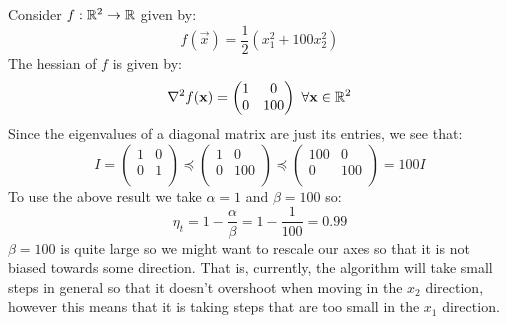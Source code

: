 \documentclass[../main.tex]{subfiles}
\begin{document}
\begin{example}
  Consider $f: \mathbb{R}^{2} \to \mathbb{R}$ given by:
  \[
    f(\vec{x}) = \frac{1}{2}(x^2_1 + 100x^2_2)
  \]
  The hessian of $f$ is given by:
  \[
    \nabla^2 f(\mathbf{\bm{x}}) = \begin{pmatrix}
    1 & 0 \\
    0 & 100 \\
    \end{pmatrix}\ \forall \mathbf{\bm{x}} \in \mathbb{R}^2
  \]
  Since the eigenvalues of a diagonal matrix are just its entries, we see that:
  \[
    I = \begin{pmatrix}
    1 & 0 \\
    0 & 1 \\
    \end{pmatrix} \preceq \begin{pmatrix}
    1 & 0 \\
    0 & 100 \\
    \end{pmatrix} \preceq \begin{pmatrix}
    100 & 0 \\
    0 & 100 \\
    \end{pmatrix} = 100I
  \]
  To use the above result we take $\alpha = 1$ and $\beta = 100$ so:
  \[
    \eta_t = 1 - \frac{\alpha}{\beta} = 1 - \frac{1}{100} = 0.99
  \]
  $\beta = 100$ is quite large so we might want to rescale our axes so that it is not biased towards some direction.
  That is, currently, the algorithm will take small steps in general so that it doesn't overshoot when moving in the $x_2$ direction, however this means that it is taking steps that are too small in the $x_1$ direction.
\end{example}
\end{document}
